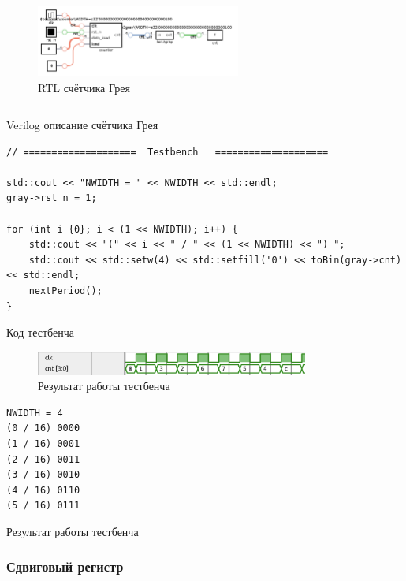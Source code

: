 \documentclass[a4paper]{article}
\begin{document}
  \begin{figure}[H]
    \centering
    \includegraphics[width=0.6\textwidth]{lab_318}
    \caption{RTL счётчика Грея}
  \end{figure}

  \begin{listing}[H]
    \inputminted{verilog}{../chapter_6/gray_cnt/gray_counter.v}
    \caption{Verilog описание счётчика Грея}
  \end{listing}

  \begin{listing}[H]
    \begin{verbatim}
// ====================  Testbench   ====================

std::cout << "NWIDTH = " << NWIDTH << std::endl;
gray->rst_n = 1;

for (int i {0}; i < (1 << NWIDTH); i++) {
    std::cout << "(" << i << " / " << (1 << NWIDTH) << ") ";
    std::cout << std::setw(4) << std::setfill('0') << toBin(gray->cnt) << std::endl;
    nextPeriod();
}
    \end{verbatim}
    \caption{Код тестбенча}
  \end{listing}

  \begin{figure}[H]
    \centering
    \includegraphics[width=0.8\textwidth]{lab_319.png}
    \caption{Результат работы тестбенча}
  \end{figure}

  \begin{listing}[H]
    \begin{verbatim}
NWIDTH = 4
(0 / 16) 0000
(1 / 16) 0001
(2 / 16) 0011
(3 / 16) 0010
(4 / 16) 0110
(5 / 16) 0111
    \end{verbatim}
    \caption{Результат работы тестбенча}
  \end{listing}

  \subsubsection{Сдвиговый регистр}
\end{document}
